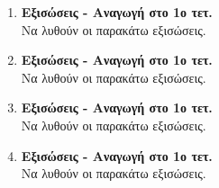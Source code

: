 \documentclass[twoside,nofonts,internet]{askhseis}
\begin{document}
\begin{enumerate}
\begin{multicols}{2}
\begin{rlist}
\end{rlist}
\end{multicols}
\item \textbf{Εξισώσεις - Αναγωγή στο 1ο τετ.}\\
Να λυθούν οι παρακάτω εξισώσεις.
\begin{multicols}{2}
\end{multicols}
\item \textbf{Εξισώσεις - Αναγωγή στο 1ο τετ.}\\
Να λυθούν οι παρακάτω εξισώσεις.
\begin{multicols}{2}
\end{multicols}
\item \textbf{Εξισώσεις - Αναγωγή στο 1ο τετ.}\\
Να λυθούν οι παρακάτω εξισώσεις.
\begin{multicols}{2}
\end{multicols}
\item \textbf{Εξισώσεις - Αναγωγή στο 1ο τετ.}\\
Να λυθούν οι παρακάτω εξισώσεις.
\begin{multicols}{2}
\end{multicols}
\end{enumerate}
\end{document}
